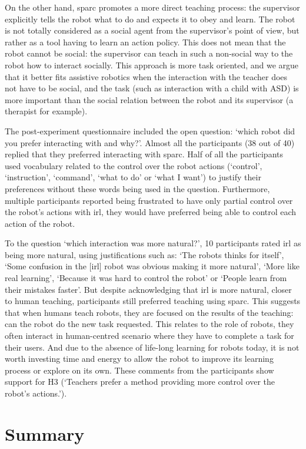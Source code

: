 On the other hand, \gls{sparc} promotes a more direct teaching process: the supervisor explicitly tells the robot what to do and expects it to obey and learn. The robot is not totally considered as a social agent from the supervisor's point of view, but rather as a tool having to learn an action policy. This does not mean that the robot cannot be social: the supervisor can teach in such a non-social way to the robot how to interact socially. This approach is more task oriented, and we argue that it better fits assistive robotics when the interaction with the teacher does not have to be social, and the task (such as interaction with a child with \gls{ASD}) is more important than the social relation between the robot and its supervisor (a therapist for example).

The post-experiment questionnaire included the open question: `which robot did you prefer interacting with and why?'. Almost all the participants (38 out of 40) replied that they preferred interacting with \gls{sparc}. Half of all the participants used vocabulary related to the control over the robot actions (`control', `instruction', `command', `what to do' or `what I want') to justify their preferences without these words being used in the question. Furthermore, multiple participants reported being frustrated to have only partial control over the robot's actions with \gls{irl}, they would have preferred being able to control each action of the robot. 

To the question `which interaction was more natural?', 10 participants rated \gls{irl} as being more natural, using justifications such as: `The robots thinks for itself', `Some confusion in the [\gls{irl}] robot was obvious making it more natural', `More like real learning', `Because it was hard to control the robot' or `People learn from their mistakes faster'. But despite acknowledging that \gls{irl} is more natural, closer to human teaching, participants still preferred teaching using \gls{sparc}. This suggests that when humans teach robots, they are focused on the results of the teaching: can the robot do the new task requested. This relates to the role of robots, they often interact in human-centred scenario where they have to complete a task for their users. And due to the absence of life-long learning for robots today, it is not worth investing time and energy to allow the robot to improve its learning process or explore on its own. These comments from the participants show support for H3 (`Teachers prefer a method providing more control over the robot's actions.').

\section{Summary}


